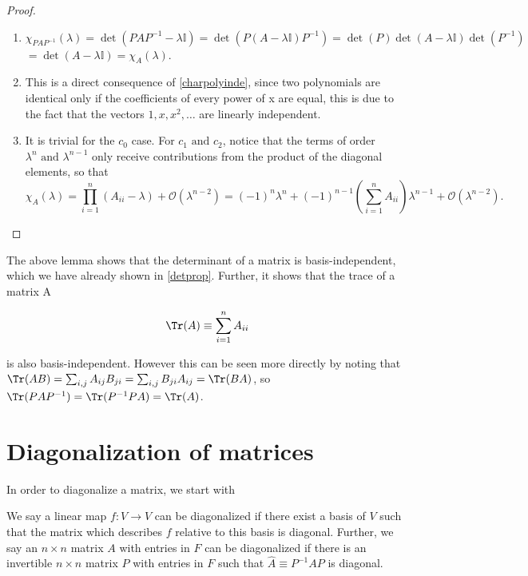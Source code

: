 \documentclass[a4paper,12pt]{report}
\begin{document}
\begin{proof}
\begin{enumerate}[label=(O\arabic*)] 
    \item \(\chi _{PAP^{-1} }(\lambda ) = \det (PAP^{-1} - \lambda \mathbb{I}) = \det (P(A-\lambda \mathbb{I})P^{-1} ) = \det (P)\det (A-\lambda \mathbb{I}) \det (P^{-1} )\) \(= \det (A - \lambda \mathbb{I}) = \chi _{A}(\lambda )  \).
    \item This is a direct consequence of \cref{charpolyinde}, since two polynomials are identical only if the coefficients of every power of x are equal, this is due to the fact that the vectors \(1, x, x^2, \ldots \) are linearly independent.
    \item It is trivial for the \(c_0 \) case. For \(c_1 \text { and } c_2 \), notice that the terms of order \(\lambda ^{n} \text { and } \lambda ^{n-1} \) only receive contributions from the product of the diagonal elements, so that
    \begin{equation}
        \chi _{A}(\lambda ) =   \prod_{i=1}^{n} (A_{ii} - \lambda  ) + \mathcal{O}(\lambda ^{n-2} ) = (-1)^{n} \lambda ^{n} + (-1)^{n-1} \left( \sum_{i=1}^{n} A_{ii}  \right) \lambda ^{n-1} + \mathcal{O}(\lambda ^{n-2} ).     
    \end{equation}
    
    
\end{enumerate}

\end{proof}

The above lemma shows that the determinant of a matrix is basis-independent, which we have already shown in \cref{detprop}. Further, it shows that the trace of a matrix A 

\begin{equation}
    \Tr (A) \equiv \sum_{i=1}^{n} A_{ii} 
\end{equation}

is also basis-independent. However this can be seen more directly by noting that \(\Tr (AB) = \sum_{i,j}^{} A_{ij} B_{ji} = \sum_{i,j}^{} B_{ji} A_{ij} = \Tr (BA)      \), so \(\Tr (PAP^{-1} ) = \Tr (P^{-1} PA) = \Tr (A)\).

\section{Diagonalization of matrices}

In order to diagonalize a matrix, we start with

\begin{definition}
We say a linear map \(f: V \rightarrow V\) can be diagonalized if there exist a basis of \(V\) such that the matrix which describes \(f\) relative to this basis is diagonal. 
Further, we say an \(n \times  n\) matrix \(A\) with entries in \(F\) can be diagonalized if there is an invertible \(n \times  n\) matrix \(P\) with entries in \(F\) such that \(\hat{A} \equiv P^{-1} AP \) is diagonal.   
\end{definition}
\end{document}
